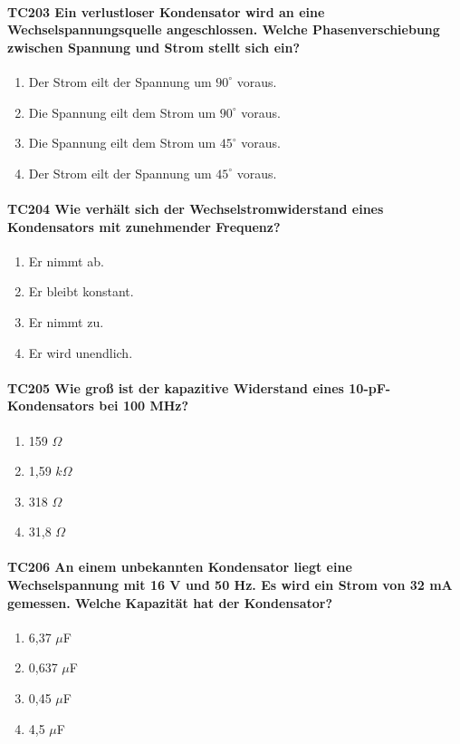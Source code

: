 \documentclass[8pt]{article}
\begin{document}
\begin{enumerate}
\begin{enumerate}[nolistsep,label=\Alph*]
{\paragraph*{TC203 Ein verlustloser Kondensator wird an eine Wechselspannungsquelle angeschlossen. Welche Phasenverschiebung zwischen Spannung und Strom stellt sich ein?}
\begin{enumerate}[nolistsep,label=\Alph*]
\item Der Strom eilt der Spannung um $90^{\circ}$ voraus.
\item Die Spannung eilt dem Strom um $90^{\circ}$ voraus.
\item Die Spannung eilt dem Strom um $45^{\circ}$ voraus.
\item Der Strom eilt der Spannung um $45^{\circ}$ voraus.
\end{enumerate}

\paragraph*{TC204 Wie verhält sich der Wechselstromwiderstand eines Kondensators mit zunehmender Frequenz?}
\begin{enumerate}[nolistsep,label=\Alph*]
\item Er nimmt ab.
\item Er bleibt konstant.
\item Er nimmt zu.
\item Er wird unendlich.
\end{enumerate}

\paragraph*{TC205 Wie groß ist der kapazitive Widerstand eines 10-pF-Kondensators bei 100 MHz?}
\begin{enumerate}[nolistsep,label=\Alph*]
\item 159 $\Omega$
\item 1,59 $k\Omega$
\item 318 $\Omega$
\item 31,8 $\Omega$
\end{enumerate}

\paragraph*{TC206 An einem unbekannten Kondensator liegt eine Wechselspannung mit 16 V und 50 Hz. Es wird ein Strom von 32 mA gemessen. Welche Kapazität hat der Kondensator?}
\begin{enumerate}[nolistsep,label=\Alph*]
\item 6,37 $\mu$F
\item 0,637 $\mu$F
\item 0,45 $\mu$F
\item 4,5 $\mu$F
\end{enumerate}

}
\end{enumerate}
\end{enumerate}
\end{document}
